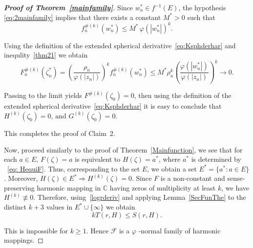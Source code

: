 \documentclass[10pt,a4paper]{amsart}
\numberwithin{equation}{section}
\begin{document}
\begin{proof}[\bf{Proof of Theorem~\ref{mainfamily}}]
Since $w_n^*\in f^{-1}(E)$, the hypothesis \eqref{eq:2mainfamily}
 implies that there exists
a constant $M^*>0$ such that
\begin{equation}\label{thm21}
f_n^{\#(k)}(w_n^*)
\leq
M^*\,\varphi(|w_n^*|)^k.
\end{equation}

Using the definition of the extended spherical
 derivative~\eqref{eq:Ksphderhar} and inequlity~\eqref{thm21} we obtain
\[
F_n^{\#(k)}(\zeta_n^*)
=
\left(\frac{\rho_n}{\varphi(|z_n|)}\right)^k
f_n^{\#(k)}(w_n^*)\leq
M^*\rho_n^k
\left(
\frac{\varphi(|w_n^*|)}
{\varphi(|z_n|)}
\right)^k\longrightarrow0.
\]

Passing to the limit yields
$
F^{\#(k)}(\zeta_0)=0
$, then using the definition of the extended spherical 
derivative~\eqref{eq:Ksphderhar}
it is easy to conclude that
$
H^{(k)}(\zeta_0)=0,\,
\text{and}\,\,
G^{(k)}(\zeta_0)=0.$\smallskip

This completes the proof of Claim~2.\smallskip
 
Now, proceed similarly to the proof of 
Theorem~\ref{Mainfunction}, we see that 
for each $a\in E, \, F(\zeta)=a$ is equivalent to $H(\zeta)=a^*$,
where $a^*$
 is determined by ~\eqref{eq: HequiF}.
Thus, corresponding to the set $E$, we obtain a set $E^*=\{a^*: a\in E\}$.
Moreover, $H(\zeta)\in E^*\Longrightarrow H^{(k)}(\zeta)=0$.
 Since $F$ is a non-constant and sense-preserving harmonic 
 mapping in $\mathbb{C}$
having zeros of multiplicity at least $k$, we have $H^{(k)}\not\equiv 0$.
Therefore, using~\eqref{logrderiv} and applying Lemma~\ref{SecFunThe}
 to the distinct $k+3$ values in $E^*\cup \{\infty\}$ we obtain
\[
    kT(r,H) \leq S(r,H).
\] 

This is impossible for $k\geq1$. Hence $\mathcal{F}$ is a $\varphi$
  -normal family of harmonic mappings.
\end{proof}
\medskip
\end{document}
